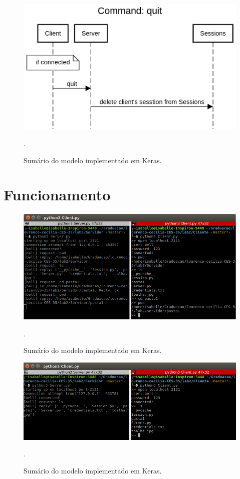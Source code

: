 \documentclass[conference]{IEEEtran}
\begin{document}
\begin{figure}[htbp]
\centering
\centerline{\includegraphics[scale=0.4]{diagrams/Command_quit.png}}
\caption{Sumário do modelo implementado em Keras.}.
\label{summary}
\end{figure}

\section{Funcionamento}

\begin{figure}[htbp]
\centering
\centerline{\includegraphics[scale=0.3]{prints/cd1.png}}
\caption{Sumário do modelo implementado em Keras.}.
\label{summary}
\end{figure}

\begin{figure}[htbp]
\centering
\centerline{\includegraphics[scale=0.3]{prints/ls1.png}}
\caption{Sumário do modelo implementado em Keras.}.
\label{summary}
\end{figure}
\end{document}
